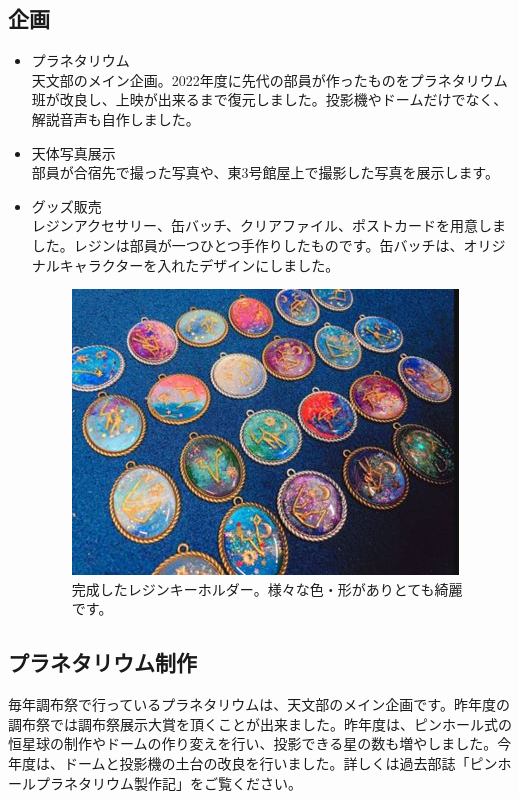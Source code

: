 \documentclass[../super_nova_20yy]{subfiles}
\begin{document}
\subsection{企画}

\begin{itemize}
  \item プラネタリウム\hbox{}\\
  天文部のメイン企画。2022年度に先代の部員が作ったものをプラネタリウム班が改良し、上映が出来るまで復元しました。投影機やドームだけでなく、解説音声も自作しました。
  \item 天体写真展示\hbox{}\\
  部員が合宿先で撮った写真や、東3号館屋上で撮影した写真を展示します。
  \item グッズ販売\hbox{}\\
  レジンアクセサリー、缶バッチ、クリアファイル、ポストカードを用意しました。レジンは部員が一つひとつ手作りしたものです。缶バッチは、オリジナルキャラクターを入れたデザインにしました。\hbox{}\\
  \begin{figure}
    \centering
    \includegraphics[width=.5\columnwidth]{画像8.jpg}
    \caption{完成したレジンキーホルダー。様々な色・形がありとても綺麗です。}
    \label{fig:8}
  \end{figure}
\end{itemize}

\subsection{プラネタリウム制作}

毎年調布祭で行っているプラネタリウムは、天文部のメイン企画です。昨年度の調布祭では調布祭展示大賞を頂くことが出来ました。昨年度は、ピンホール式の恒星球の制作やドームの作り変えを行い、投影できる星の数も増やしました。今年度は、ドームと投影機の土台の改良を行いました。詳しくは過去部誌「ピンホールプラネタリウム製作記」をご覧ください。
\end{document}
